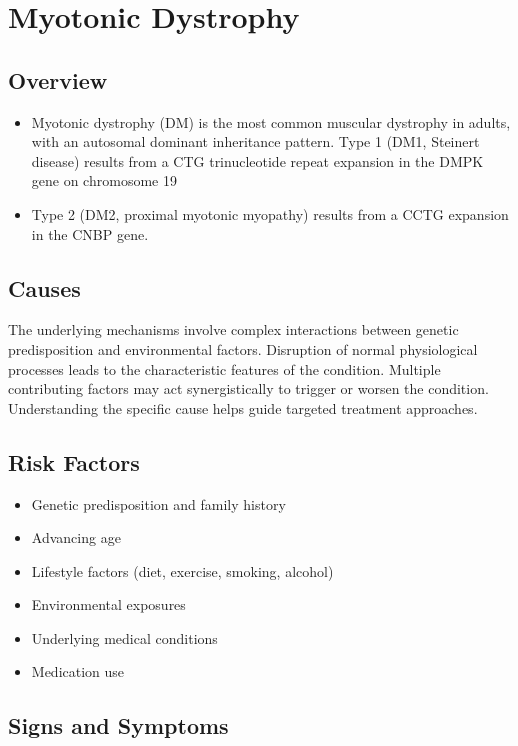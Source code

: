 \chapter{Myotonic Dystrophy}
\label{sec:Myotonic Dystrophy}

\section{Overview}


\begin{itemize}[noitemsep]
  \item Myotonic dystrophy (DM) is the most common muscular dystrophy in adults, with an autosomal dominant inheritance pattern. Type 1 (DM1, Steinert disease) results from a CTG trinucleotide repeat expansion in the DMPK gene on chromosome 19
  \item Type 2 (DM2, proximal myotonic myopathy) results from a CCTG expansion in the CNBP gene.
\end{itemize}
\section{Causes}
The underlying mechanisms involve complex interactions between genetic predisposition and environmental factors. Disruption of normal physiological processes leads to the characteristic features of the condition. Multiple contributing factors may act synergistically to trigger or worsen the condition. Understanding the specific cause helps guide targeted treatment approaches.
\section{Risk Factors}


\begin{itemize}[noitemsep]
  \item Genetic predisposition and family history
  \item Advancing age
  \item Lifestyle factors (diet, exercise, smoking, alcohol)
  \item Environmental exposures
  \item Underlying medical conditions
  \item Medication use
\end{itemize}
\section{Signs and Symptoms}

